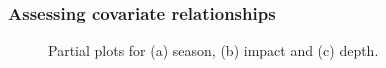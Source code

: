 \begin{frame}[fragile]
\frametitle{Assessing covariate relationships}
\begin{figure}[h]
  \centering
  \hfill
  \caption{Partial plots for (a) season, (b) impact and (c) depth.}
  \label{fig:partials}
\end{figure}
\end{frame}

